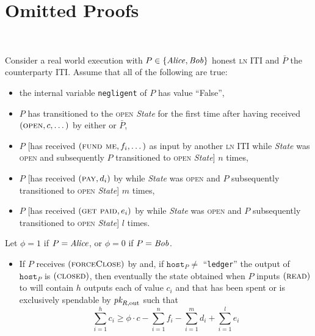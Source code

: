 \section{Omitted Proofs} \ \\
\label{sec:proofs}

\begin{lemma}
\label{lemma:real-balance-security}
  Consider a real world execution with $P \in \{\mathit{Alice}, \mathit{Bob}\}$ honest
  \textsc{ln} ITI and $\bar{P}$ the counterparty ITI. Assume that all of the
  following are true:
  \begin{itemize}
    \item the internal variable \texttt{negligent} of $P$ has value ``False'',
    \item $P$ has transitioned to the \textsc{open} \textit{State} for the first
    time after having received $(\textsc{open}, c, \dots)$ by either
    \environment or $\bar{P}$,
    \item $P$ [has received $(\textsc{fund me}, f_i, \dots)$ as input by another
    \textsc{ln} ITI while \textit{State} was \textsc{open} and subsequently $P$
    transitioned to \textsc{open} \textit{State}] $n$ times,
    \item $P$ [has received $(\textsc{pay}, d_i)$ by \environment while
    \textit{State} was \textsc{open} and $P$ subsequently transitioned to
    \textsc{open} \textit{State}] $m$ times,
    \item $P$ [has received $(\textsc{get paid}, e_i)$ by \environment while
    \textit{State} was \textsc{open} and $P$ subsequently transitioned to
    \textsc{open} \textit{State}] $l$ times.
  \end{itemize}
  Let $\phi = 1$ if $P = \mathit{Alice}$, or $\phi = 0$ if $P = \mathit{Bob}$.
  \begin{itemize}
    \item If $P$ receives $(\textsc{forceClose})$ by \environment and, if
    $\texttt{host}_P \neq$ ``\texttt{ledger}'' the output of $\texttt{host}_P$
    is $(\textsc{closed})$, then eventually the state obtained when $P$ inputs
    $(\textsc{read})$ to \ledger will contain $h$ outputs each of value $c_i$
    and that has been spent or is exclusively spendable by $\textit{pk}_{R,
    \mathrm{out}}$ such that
    \begin{equation}
    \label{lemma:real-balance-security:ineq}
      \sum\limits_{i=1}^h c_i \geq \phi \cdot c - \sum\limits_{i=1}^n f_i -
      \sum\limits_{i=1}^m d_i + \sum\limits_{i=1}^l e_i
    \end{equation}

\end{itemize}
\end{lemma}
